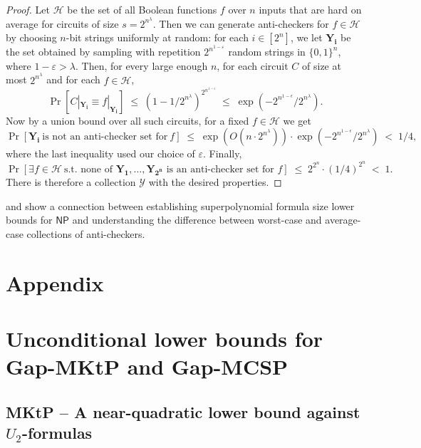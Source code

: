 \documentclass{toc}
\begin{document}
\begin{proof}  Let $\mathcal{H}$ be the set of all Boolean functions $f$ over $n$ inputs that are hard on average for circuits of size $s = 2^{n^{\lambda}}$. Then we can generate anti-checkers for $f\in \mathcal{H}$ by choosing $n$-bit strings uniformly at random: for each $i \in [2^n]$, we let $\bm{Y_i}$ be the set obtained by sampling with repetition $2^{n^{1 - \varepsilon}}$ random strings in $\{0,1\}^n$, where $1 - \varepsilon > \lambda$. Then, for every large enough $n$, for each circuit $C$ of size at most $2^{n^\lambda}$ and for each $f \in \mathcal{H}$, 
$$\Pr[C|_{\bm{Y_i}}\equiv f|_{\bm{Y_i}}] \;\leq\; (1-1/2^{n^\lambda})^{2^{n^{1-\epsilon}}} \;\leq\; \exp(-2^{n^{1-\epsilon}}/2^{n^\lambda}).$$ 
Now by a union bound over all such circuits, for a fixed $f \in \mathcal{H}$ we get 
$$\Pr[\bm{Y_i}~\text{is not an anti-checker set for}~f] \;\leq\; \exp(O(n \cdot 2^{n^\lambda})) \cdot \exp(-2^{n^{1-\epsilon}}/2^{n^\lambda}) \;<\; 1/4,$$ where the last inequality used our choice of $\varepsilon$. Finally, $$\Pr[\exists f\in \mathcal{H}~\text{s.t.~none of~}\bm{Y_1},\dots,\bm{Y_{2^n}}\text{~is an anti-checker set for~}f] \;\leq\; 2^{2^n}\cdot (1/4)^{2^n} \;<\; 1.$$
There is therefore a collection $\mathcal{Y}$ with the desired properties.
\end{proof}

 and  show a connection between establishing superpolynomial formula size lower bounds for $\mathsf{NP}$ and understanding the  difference between worst-case and average-case collections of anti-checkers.






\section*{Appendix}



\section{Unconditional lower bounds for Gap-MKtP and Gap-MCSP}

\subsection{MKtP -- A near-quadratic lower bound against $U_2$-formulas}\label{ss:quadratic}
\end{document}
